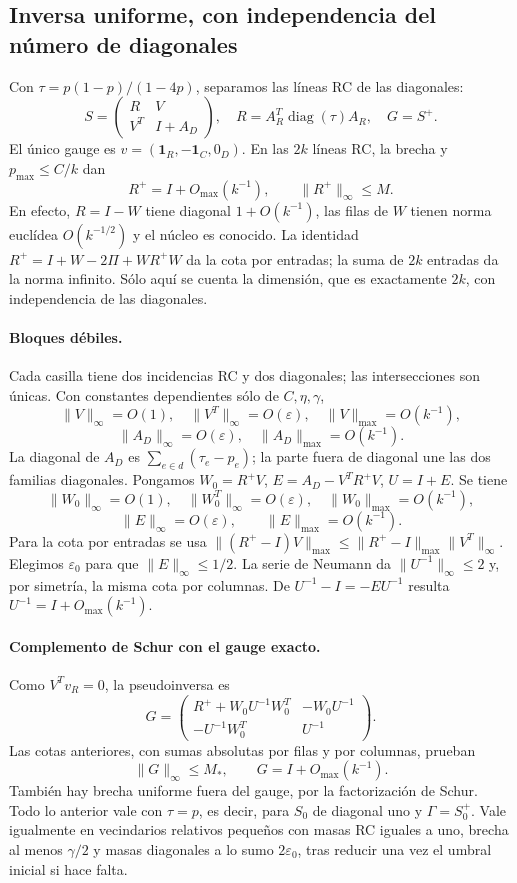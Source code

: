 \subsection{Inversa uniforme, con independencia del número de diagonales}\label{sec:B5T02}
Con $\tau=p(1-p)/(1-4p)$, separamos las líneas RC de las diagonales:
\[
 S=\begin{pmatrix}R&V\\V^T&I+A_D\end{pmatrix},\quad
 R=A_R^T\operatorname{diag}(\tau)A_R,\quad G=S^+.
\]
El único gauge es $v=(\mathbf1_R,-\mathbf1_C,0_D)$.
En las $2k$ líneas RC, la brecha y $p_{\max}\le C/k$ dan
\[
 R^+=I+O_{\max}(k^{-1}),\qquad \|R^+\|_\infty\le M.
\]
En efecto, $R=I-W$ tiene diagonal $1+O(k^{-1})$, las filas de $W$
tienen norma euclídea $O(k^{-1/2})$ y el núcleo es conocido.
La identidad $R^+=I+W-2\Pi+WR^+W$ da la cota por entradas;
la suma de $2k$ entradas da la norma infinito. Sólo aquí se cuenta la dimensión,
que es exactamente $2k$, con independencia de las diagonales.

\paragraph{Bloques débiles.}
Cada casilla tiene dos incidencias RC y dos diagonales; las intersecciones
son únicas. Con constantes dependientes sólo de $C,\eta,\gamma$,
\[
 \|V\|_\infty=O(1),\quad \|V^T\|_\infty=O(\varepsilon),
 \quad \|V\|_{\max}=O(k^{-1}),
\]
\[
 \|A_D\|_\infty=O(\varepsilon),\quad \|A_D\|_{\max}=O(k^{-1}).
\]
La diagonal de $A_D$ es $\sum_{e\in d}(\tau_e-p_e)$;
la parte fuera de diagonal une las dos familias diagonales.
Pongamos $W_0=R^+V$, $E=A_D-V^TR^+V$, $U=I+E$.
Se tiene
\[
 \|W_0\|_\infty=O(1),\quad\|W_0^T\|_\infty=O(\varepsilon),
 \quad\|W_0\|_{\max}=O(k^{-1}),
\]
\[
 \|E\|_\infty=O(\varepsilon),\qquad\|E\|_{\max}=O(k^{-1}).
\]
Para la cota por entradas se usa
$\|(R^+-I)V\|_{\max}\le\|R^+-I\|_{\max}\|V^T\|_\infty$.
Elegimos $\varepsilon_0$ para que $\|E\|_\infty\le1/2$.
La serie de Neumann da $\|U^{-1}\|_\infty\le2$ y, por simetría, la misma cota por columnas.
De $U^{-1}-I=-EU^{-1}$ resulta $U^{-1}=I+O_{\max}(k^{-1})$.

\paragraph{Complemento de Schur con el gauge exacto.}
Como $V^Tv_R=0$, la pseudoinversa es
\[
 G=\begin{pmatrix}
 R^++W_0U^{-1}W_0^T&-W_0U^{-1}\\
 -U^{-1}W_0^T&U^{-1}
 \end{pmatrix}.
\]
Las cotas anteriores, con sumas absolutas por filas y por columnas, prueban
\[
 \boxed{\|G\|_\infty\le M_*,\qquad G=I+O_{\max}(k^{-1}).}
\]
También hay brecha uniforme fuera del gauge, por la factorización de Schur.
Todo lo anterior vale con $\tau=p$, es decir, para $S_0$ de diagonal uno y $\Gamma=S_0^+$.
Vale igualmente en vecindarios relativos pequeños con masas RC iguales a uno,
brecha al menos $\gamma/2$ y masas diagonales a lo sumo $2\varepsilon_0$,
tras reducir una vez el umbral inicial si hace falta.

